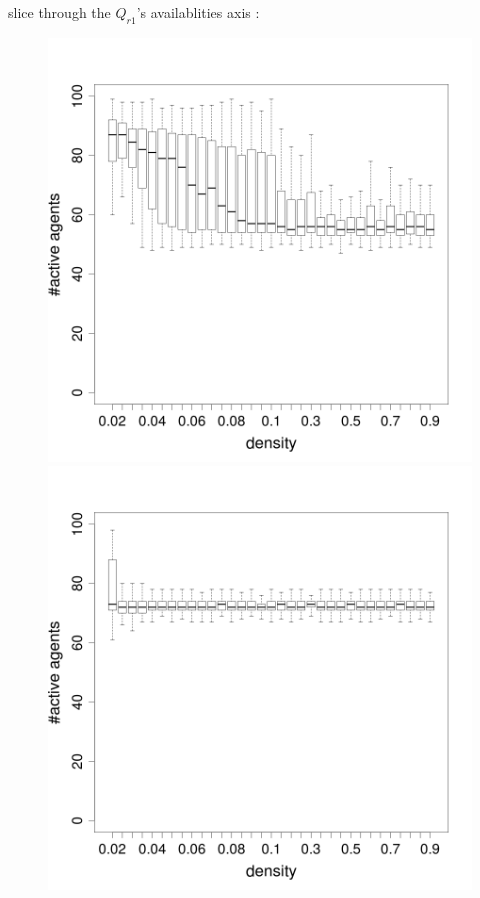 \documentclass[8pt, handout=show,notes=show]{beamer}
\begin{document}
\begin{frame}{slice through the $Q_{r1}$'s availablities axis : }
\begin{figure}[H]
\includegraphics[width=\imgSize]{images/alive_density_r1-50.png}
\includegraphics[width=\imgSize]{images/alive_density_r1-70.png}\\

\end{figure}
\end{frame}
\end{document}
